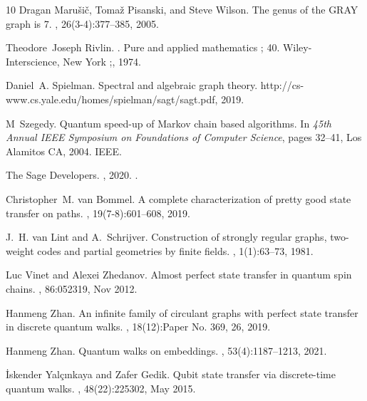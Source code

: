 \documentclass{article}
\numberwithin{equation}{section}
\begin{document}
\begin{thebibliography}{10}
Dragan Maru\v{s}i\v{c}, Toma\v{z}{} Pisanski, and Steve Wilson.
\newblock The genus of the {GRAY} graph is 7.
, 26(3-4):377--385, 2005.

Theodore~Joseph Rivlin.
.
\newblock Pure and applied mathematics ; 40. Wiley-Interscience, New York ;, 1974.

Daniel~A. Spielman.
\newblock Spectral and algebraic graph theory.
\newblock http://cs-www.cs.yale.edu/homes/spielman/sagt/sagt.pdf, 2019.

M~Szegedy.
\newblock Quantum speed-up of {M}arkov chain based algorithms.
\newblock In {\em 45th Annual IEEE Symposium on Foundations of Computer Science}, pages 32--41, Los Alamitos CA, 2004. IEEE.

{The Sage Developers}.
, 2020.
.

Christopher~M. van Bommel.
\newblock A complete characterization of pretty good state transfer on paths.
, 19(7-8):601--608, 2019.

J.~H. van Lint and A.~Schrijver.
\newblock Construction of strongly regular graphs, two-weight codes and partial geometries by finite fields.
, 1(1):63--73, 1981.

Luc Vinet and Alexei Zhedanov.
\newblock Almost perfect state transfer in quantum spin chains.
, 86:052319, Nov 2012.

Hanmeng Zhan.
\newblock An infinite family of circulant graphs with perfect state transfer in discrete quantum walks.
, 18(12):Paper No. 369, 26, 2019.

Hanmeng Zhan.
\newblock Quantum walks on embeddings.
, 53(4):1187--1213, 2021.

İskender Yalçınkaya and Zafer Gedik.
\newblock Qubit state transfer via discrete-time quantum walks.
, 48(22):225302, {M}ay 2015.

\end{thebibliography}
\end{document}
